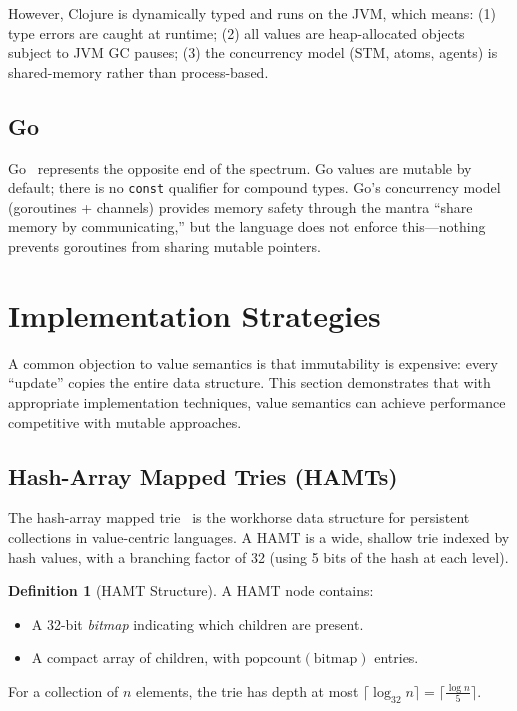 \documentclass[11pt]{article}
\theoremstyle{definition}
\newtheorem{definition}[theorem]{Definition}
\theoremstyle{remark}
\begin{document}
However, Clojure is dynamically typed and runs on the JVM, which
means: (1) type errors are caught at runtime; (2) all values are
heap-allocated objects subject to JVM GC pauses; (3) the concurrency
model (STM, atoms, agents) is shared-memory rather than process-based.

\subsection{Go}

Go~\cite{donovan2015go} represents the opposite end of the spectrum.
Go values are mutable by default; there is no \texttt{const}
qualifier for compound types.  Go's concurrency model
(goroutines + channels) provides memory safety through the mantra
``share memory by communicating,'' but the language does not enforce
this---nothing prevents goroutines from sharing mutable pointers.


\section{Implementation Strategies}
\label{sec:implementation}

A common objection to value semantics is that immutability is
expensive: every ``update'' copies the entire data structure.  This
section demonstrates that with appropriate implementation techniques,
value semantics can achieve performance competitive with mutable
approaches.

\subsection{Hash-Array Mapped Tries (HAMTs)}
\label{sec:implementation:hamt}

The hash-array mapped trie~\cite{bagwell2001ideal} is the workhorse
data structure for persistent collections in value-centric languages.
A HAMT is a wide, shallow trie indexed by hash values, with a
branching factor of 32 (using 5 bits of the hash at each level).

\begin{definition}[HAMT Structure]
\label{def:hamt}
A HAMT node contains:
\begin{itemize}
  \item A 32-bit \emph{bitmap} indicating which children are present.
  \item A compact array of children, with $\mathrm{popcount}(\text{bitmap})$
    entries.
\end{itemize}
For a collection of $n$ elements, the trie has depth at most
$\lceil \log_{32} n \rceil = \lceil \frac{\log n}{5} \rceil$.
\end{definition}
\end{document}
